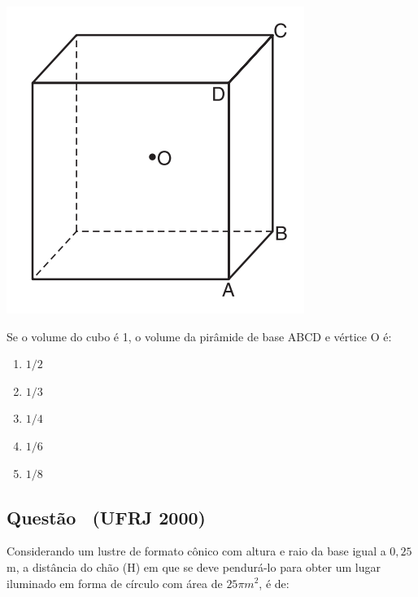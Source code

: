 \documentclass[12pt]{article}
\newcounter{questao}
\newcommand{\novaquestao}[1]{%
  \stepcounter{questao}%
  \subsection*{Questão \thequestao\ (#1)}%
}
\begin{document}
\begin{multicols}{2}
            \begin{center}
                \includegraphics[scale=0.6]{imagem/qUFRS.png}
            \end{center} Se o volume do cubo é 1, o volume da pirâmide de base ABCD e vértice O é:
            
            \begin{enumerate}[label=(\alph*), noitemsep]
                \item ${1}/{2}$
                \item ${1}/{3}$
                \item ${1}/{4}$ 
                \item {${1}/{6}$} %
                \item ${1}/{8}$
            \end{enumerate}
        
        \novaquestao{UFRJ 2000}
            Considerando um lustre de formato cônico com altura e raio da base igual a $0,25$ m, a distância do chão (H) em que se deve pendurá-lo para obter um lugar iluminado em forma de círculo com área de $25\pi m^{2}$, é de:


\end{multicols}
\end{document}
